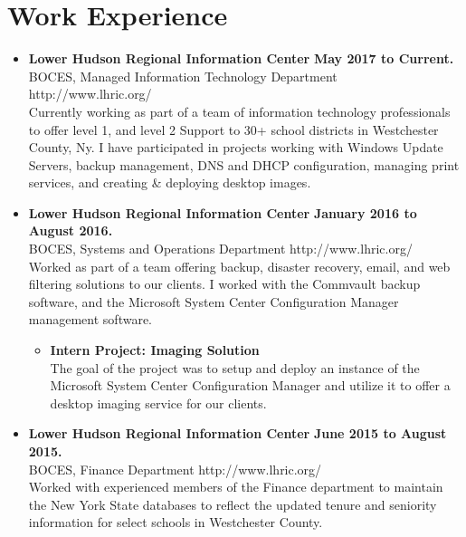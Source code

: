 \documentclass[10pt]{Article}
\begin{document}
\section*{Work Experience}
\begin{itemize}[topsep=1ex, itemsep=.5ex, parsep=0ex, partopsep=.75ex]
	\item[]{{\bf Lower Hudson Regional Information Center} \hfill {\bf May 2017 to Current.}}\\
	BOCES, Managed Information Technology Department \hfill http://www.lhric.org/\\
	Currently working as part of a team of information technology professionals to offer level 1, and level 2 Support to 30+ school districts in Westchester County, Ny.
	I have participated in projects working with Windows Update Servers, backup management, DNS and DHCP configuration, managing print services, and creating \& deploying desktop images.
	\item[]{{\bf Lower Hudson Regional Information Center} \hfill {\bf January 2016 to August 2016.}}\\
	BOCES, Systems and Operations Department \hfill http://www.lhric.org/\\
	Worked as part of a team offering backup, disaster recovery, email, and web filtering solutions to our clients. I worked with the Commvault backup software, and the Microsoft System Center Configuration Manager management software.
	\begin{itemize}[topsep=1ex, itemsep=.5ex, parsep=0ex, partopsep=.75ex]
		\item[]{\bf Intern Project: Imaging Solution}\\
		The goal of the project was to setup and deploy an instance of the Microsoft System Center Configuration Manager and utilize it to offer a desktop imaging service for our clients.
	\end{itemize}
	\item[]{{\bf Lower Hudson Regional Information Center} \hfill {\bf June 2015 to August 2015.}}\\
	BOCES, Finance Department \hfill http://www.lhric.org/\\
	Worked with experienced members of the Finance department to maintain the New York
	State databases to reflect the updated tenure and seniority information for select schools in Westchester County.
\end{itemize}
\end{document}
